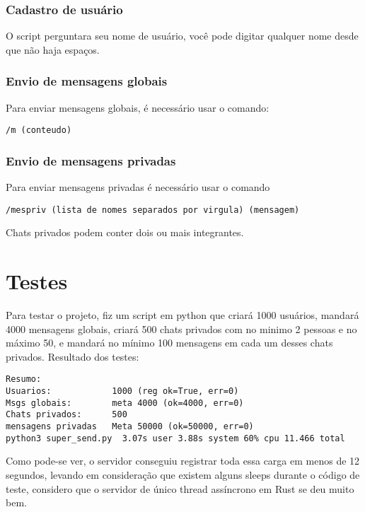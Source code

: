 \documentclass{article}
\begin{document}
{{        \subsubsection{Cadastro de usuário}
         O script perguntara seu nome de usuário, você pode digitar qualquer nome desde que não haja espaços.
        \subsubsection{Envio de mensagens globais}
        {
            Para enviar mensagens globais, é necessário usar o comando:
            \begin{verbatim}
/m (conteudo)
            \end{verbatim}
        }
        \subsubsection{Envio de mensagens privadas}
        {
            Para enviar mensagens privadas é necessário usar o comando
                \begin{verbatim}
/mespriv (lista de nomes separados por virgula) (mensagem)
                \end{verbatim}
                Chats privados podem conter dois ou mais integrantes.
        }
        
    }

    \section{Testes}
    {
        Para testar o projeto, fiz um script em python que criará 1000 usuários, mandará 4000 mensagens globais, criará 500 chats privados com no minimo 2 pessoas e no máximo 50, e mandará no mínimo 100 mensagens em cada um desses chats privados.
        Resultado dos testes:
        
        \begin{verbatim}
Resumo:
Usuarios:            1000 (reg ok=True, err=0)
Msgs globais:        meta 4000 (ok=4000, err=0)
Chats privados:      500
mensagens privadas   Meta 50000 (ok=50000, err=0)
python3 super_send.py  3.07s user 3.88s system 60% cpu 11.466 total
        \end{verbatim}
        Como pode-se ver, o servidor conseguiu registrar toda essa carga em menos de 12 segundos, levando em consideração que existem alguns sleeps durante o código de teste, considero que o servidor de único thread assíncrono em Rust se deu muito bem.
    }
}
\end{document}
